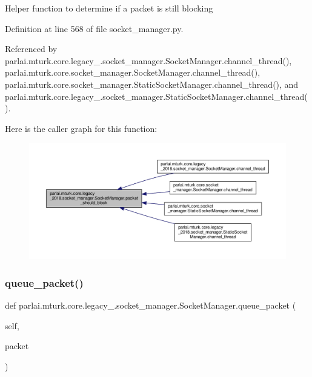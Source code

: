 \begin{DoxyVerb}Helper function to determine if a packet is still blocking\end{DoxyVerb}
 

Definition at line 568 of file socket\+\_\+manager.\+py.



Referenced by parlai.\+mturk.\+core.\+legacy\+\_.\+socket\+\_\+manager.\+Socket\+Manager.\+channel\+\_\+thread(), parlai.\+mturk.\+core.\+socket\+\_\+manager.\+Socket\+Manager.\+channel\+\_\+thread(), parlai.\+mturk.\+core.\+socket\+\_\+manager.\+Static\+Socket\+Manager.\+channel\+\_\+thread(), and parlai.\+mturk.\+core.\+legacy\+\_.\+socket\+\_\+manager.\+Static\+Socket\+Manager.\+channel\+\_\+thread().

Here is the caller graph for this function\+:
\nopagebreak
\begin{figure}[H]
\begin{center}
\leavevmode
\includegraphics[width=350pt]{classparlai_1_1mturk_1_1core_1_1legacy__2018_1_1socket__manager_1_1SocketManager_a8793f6a47fa15f3b76b3660240563492_icgraph}
\end{center}
\end{figure}
\mbox{\label{classparlai_1_1mturk_1_1core_1_1legacy__2018_1_1socket__manager_1_1SocketManager_a806197fb2a39b170bdc10f93f010318c}} 
\subsubsection{\texorpdfstring{queue\+\_\+packet()}{queue\_packet()}}
{\footnotesize\ttfamily def parlai.\+mturk.\+core.\+legacy\+\_.\+socket\+\_\+manager.\+Socket\+Manager.\+queue\+\_\+packet (\begin{DoxyParamCaption}\item[{}]{self,  }\item[{}]{packet }\end{DoxyParamCaption})}

